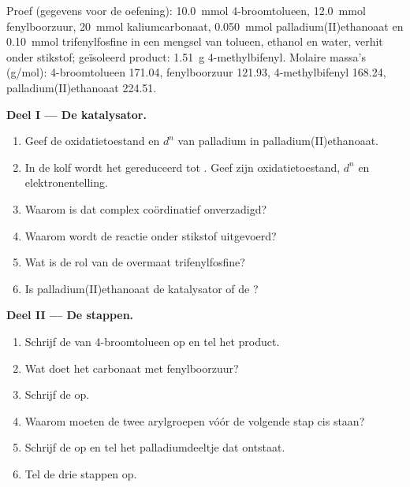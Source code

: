 \begin{problem}
\label{pb:b2:catalytic-cycles:1}
Proef (gegevens voor de oefening): \qty{10.0}{mmol} 4-broomtolueen, \qty{12.0}{mmol}
fenylboorzuur, \qty{20}{mmol} kaliumcarbonaat, \qty{0.050}{mmol} palladium(II)ethanoaat
en \qty{0.10}{mmol} trifenylfosfine in een mengsel van tolueen, ethanol en
water, verhit onder stikstof; geïsoleerd product: \qty{1.51}{g} 4-methylbifenyl. Molaire
massa's (\unit{g/mol}): 4-broomtolueen 171.04, fenylboorzuur 121.93, 4-methylbifenyl
168.24, palladium(II)ethanoaat 224.51.

\medskip
\noindent\textbf{Deel I --- De katalysator.}
\begin{enumerate}
  \item Geef de oxidatietoestand en $d^n$ van palladium in palladium(II)ethanoaat.
  \item In de kolf wordt het gereduceerd tot . Geef zijn oxidatietoestand, $d^n$ en
        elektronentelling.
  \item Waarom is dat complex coördinatief onverzadigd?
  \item Waarom wordt de reactie onder stikstof uitgevoerd?
  \item Wat is de rol van de overmaat trifenylfosfine?
  \item Is palladium(II)ethanoaat de katalysator of de ?
\end{enumerate}

\medskip
\noindent\textbf{Deel II --- De stappen.}
\begin{enumerate}[resume]
  \item Schrijf de  van 4-broomtolueen op en tel het product.
  \item Wat doet het carbonaat met fenylboorzuur?
  \item Schrijf de  op.
  \item Waarom moeten de twee arylgroepen vóór de volgende stap cis staan?
  \item Schrijf de  op en tel het palladiumdeeltje dat ontstaat.
  \item Tel de drie stappen op.
\end{enumerate}


\end{problem}
